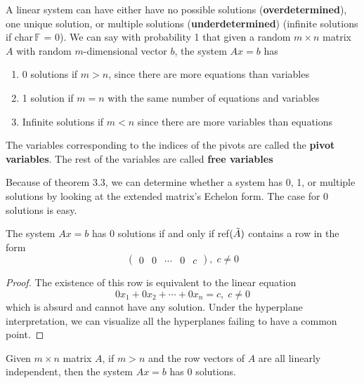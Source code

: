   \begin{definition}
    A linear system can have either have no possible solutions (\textbf{overdetermined}), one unique solution, or multiple solutions (\textbf{underdetermined}) (infinite solutions if char$\, \mathbb{F}$ = 0). We can say with probability 1 that given a random $m \times n$ matrix $A$ with random $m$-dimensional vector $b$, the system $A x = b$ has
    \begin{enumerate}
      \item 0 solutions if $m > n$, since there are more equations than variables
      \item 1 solution if $m = n$ with the same number of equations and variables
      \item Infinite solutions if $m < n$ since there are more variables than equations
    \end{enumerate}
  \end{definition}

  \begin{definition}
    The variables corresponding to the indices of the pivots are called the \textbf{pivot variables}. The rest of the variables are called \textbf{free variables}
  \end{definition}

  Because of theorem 3.3, we can determine whether a system has 0, 1, or multiple solutions by looking at the extended matrix's Echelon form. The case for 0 solutions is easy. 

  \begin{theorem}
    The system $A x = b$ has 0 solutions if and only if ref$(\Tilde{A})$ contains a row in the form 
    \begin{equation}
      \begin{pmatrix}
      0 & 0 & \cdots & 0 & c
      \end{pmatrix}, \; c \neq 0
    \end{equation}
  \end{theorem}
  \begin{proof}
    The existence of this row is equivalent to the linear equation
    \begin{equation}
      0 x_1 + 0 x_2 + \cdots + 0 x_n = c, \; c \neq 0
    \end{equation}
    which is absurd and cannot have any solution. Under the hyperplane interpretation, we can visualize all the hyperplanes failing to have a common point. 
  \end{proof}

  \begin{corollary}
    Given $m \times n$ matrix $A$, if $m > n$ and the row vectors of $A$ are all linearly independent, then the system $A x = b$ has 0 solutions. 
  \end{corollary}

